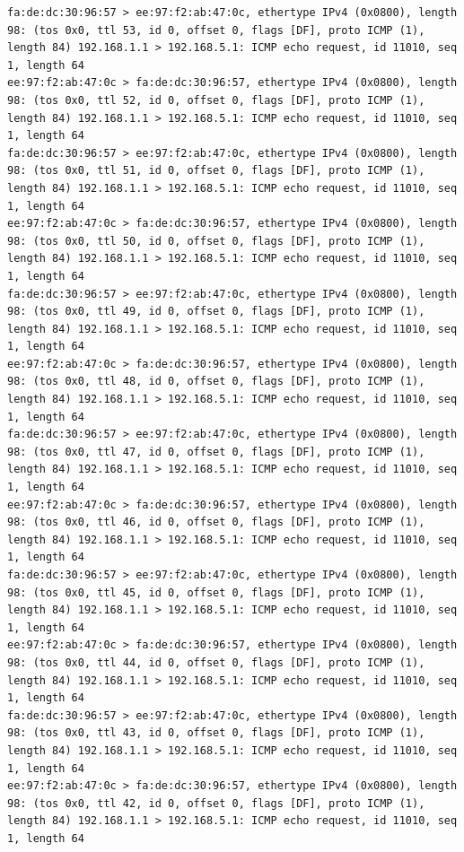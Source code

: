 \documentclass[a4paper,12pt]{article}
\begin{document}
\begin{Verbatim}
fa:de:dc:30:96:57 > ee:97:f2:ab:47:0c, ethertype IPv4 (0x0800), length 98: (tos 0x0, ttl 53, id 0, offset 0, flags [DF], proto ICMP (1), length 84) 192.168.1.1 > 192.168.5.1: ICMP echo request, id 11010, seq 1, length 64
ee:97:f2:ab:47:0c > fa:de:dc:30:96:57, ethertype IPv4 (0x0800), length 98: (tos 0x0, ttl 52, id 0, offset 0, flags [DF], proto ICMP (1), length 84) 192.168.1.1 > 192.168.5.1: ICMP echo request, id 11010, seq 1, length 64
fa:de:dc:30:96:57 > ee:97:f2:ab:47:0c, ethertype IPv4 (0x0800), length 98: (tos 0x0, ttl 51, id 0, offset 0, flags [DF], proto ICMP (1), length 84) 192.168.1.1 > 192.168.5.1: ICMP echo request, id 11010, seq 1, length 64
ee:97:f2:ab:47:0c > fa:de:dc:30:96:57, ethertype IPv4 (0x0800), length 98: (tos 0x0, ttl 50, id 0, offset 0, flags [DF], proto ICMP (1), length 84) 192.168.1.1 > 192.168.5.1: ICMP echo request, id 11010, seq 1, length 64
fa:de:dc:30:96:57 > ee:97:f2:ab:47:0c, ethertype IPv4 (0x0800), length 98: (tos 0x0, ttl 49, id 0, offset 0, flags [DF], proto ICMP (1), length 84) 192.168.1.1 > 192.168.5.1: ICMP echo request, id 11010, seq 1, length 64
ee:97:f2:ab:47:0c > fa:de:dc:30:96:57, ethertype IPv4 (0x0800), length 98: (tos 0x0, ttl 48, id 0, offset 0, flags [DF], proto ICMP (1), length 84) 192.168.1.1 > 192.168.5.1: ICMP echo request, id 11010, seq 1, length 64
fa:de:dc:30:96:57 > ee:97:f2:ab:47:0c, ethertype IPv4 (0x0800), length 98: (tos 0x0, ttl 47, id 0, offset 0, flags [DF], proto ICMP (1), length 84) 192.168.1.1 > 192.168.5.1: ICMP echo request, id 11010, seq 1, length 64
ee:97:f2:ab:47:0c > fa:de:dc:30:96:57, ethertype IPv4 (0x0800), length 98: (tos 0x0, ttl 46, id 0, offset 0, flags [DF], proto ICMP (1), length 84) 192.168.1.1 > 192.168.5.1: ICMP echo request, id 11010, seq 1, length 64
fa:de:dc:30:96:57 > ee:97:f2:ab:47:0c, ethertype IPv4 (0x0800), length 98: (tos 0x0, ttl 45, id 0, offset 0, flags [DF], proto ICMP (1), length 84) 192.168.1.1 > 192.168.5.1: ICMP echo request, id 11010, seq 1, length 64
ee:97:f2:ab:47:0c > fa:de:dc:30:96:57, ethertype IPv4 (0x0800), length 98: (tos 0x0, ttl 44, id 0, offset 0, flags [DF], proto ICMP (1), length 84) 192.168.1.1 > 192.168.5.1: ICMP echo request, id 11010, seq 1, length 64
fa:de:dc:30:96:57 > ee:97:f2:ab:47:0c, ethertype IPv4 (0x0800), length 98: (tos 0x0, ttl 43, id 0, offset 0, flags [DF], proto ICMP (1), length 84) 192.168.1.1 > 192.168.5.1: ICMP echo request, id 11010, seq 1, length 64
ee:97:f2:ab:47:0c > fa:de:dc:30:96:57, ethertype IPv4 (0x0800), length 98: (tos 0x0, ttl 42, id 0, offset 0, flags [DF], proto ICMP (1), length 84) 192.168.1.1 > 192.168.5.1: ICMP echo request, id 11010, seq 1, length 64

\end{Verbatim}
\end{document}
